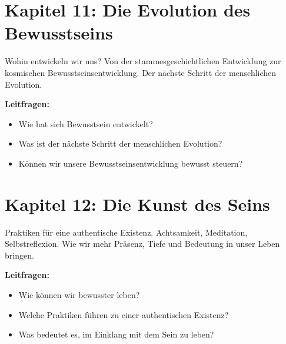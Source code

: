 \section*{Kapitel 11: Die Evolution des Bewusstseins}

Wohin entwickeln wir uns? Von der stammesgeschichtlichen Entwicklung zur kosmischen Bewusstseinsentwicklung. Der nächste Schritt der menschlichen Evolution.

\textbf{Leitfragen:}
\begin{itemize}
	\item Wie hat sich Bewusstsein entwickelt?
	\item Was ist der nächste Schritt der menschlichen Evolution?
	\item Können wir unsere Bewusstseinsentwicklung bewusst steuern?
\end{itemize}

\section*{Kapitel 12: Die Kunst des Seins}

Praktiken für eine authentische Existenz. Achtsamkeit, Meditation, Selbstreflexion. Wie wir mehr Präsenz, Tiefe und Bedeutung in unser Leben bringen.

\textbf{Leitfragen:}
\begin{itemize}
	\item Wie können wir bewusster leben?
	\item Welche Praktiken führen zu einer authentischen Existenz?
	\item Was bedeutet es, im Einklang mit dem Sein zu leben?
\end{itemize}

